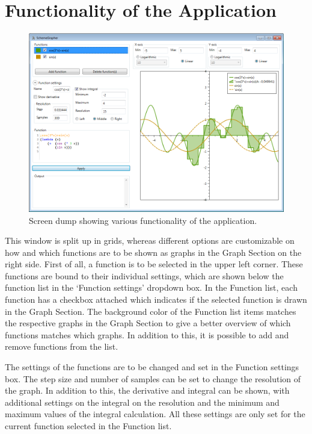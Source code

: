 \documentclass[a4paper,12pt]{article}
\begin{document}
\section{Functionality of the Application}

\begin{figure}[h]
	\centering
	\includegraphics[scale=0.5]{schemegraphersscreen1}
	\caption{Screen dump showing various functionality of the application. }
    \label{fig:screendump}
\end{figure}

This window is split up in grids, whereas different options are customizable on how and which functions are to be shown as graphs in the Graph Section on the right side. First of all, a function is to be selected in the upper left corner. These functions are bound to their individual settings, which are shown below the function list in the ‘Function settings’ dropdown box. In the Function list, each function has a checkbox attached which indicates if the selected function is drawn in the Graph Section. The background color of the Function list items matches the respective graphs in the Graph Section to give a better overview of which functions matches which graphs. In addition to this, it is possible to add and remove functions from the list.

The settings of the functions are to be changed and set in the Function settings box. The step size and number of samples can be set to change the resolution of the graph. In addition to this, the derivative and integral can be shown, with additional settings on the integral on the resolution and the minimum and maximum values of the integral calculation. All these settings are only set for the current function selected in the Function list.
\end{document}
